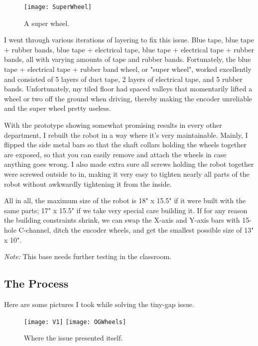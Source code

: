 \begin{figure}[h]
    \centering
    \texttt{[image: SuperWheel]}
    \caption{
        A super wheel.
    }
\end{figure}

I went through various iterations of layering to fix this issue. Blue tape, blue tape + rubber bands, blue tape + electrical tape, blue tape + electrical tape + rubber bands, all with varying amounts of tape and rubber bands. Fortunately, the blue tape + electrical tape + rubber band wheel, or "super wheel", worked excellently and consisted of 5 layers of duct tape, 2 layers of electrical tape, and 5 rubber bands. Unfortunately, my tiled floor had spaced valleys that momentarily lifted a wheel or two off the ground when driving, thereby making the encoder unreliable and the super wheel pretty useless.

With the prototype showing somewhat promising results in every other department, I rebuilt the robot in a way where it's very maintainable. Mainly, I flipped the side metal bars so that the shaft collars holding the wheels together are exposed, so that you can easily remove and attach the wheels in case anything goes wrong. I also made extra sure all screws holding the robot together were screwed outside to in, making it very easy to tighten nearly all parts of the robot without awkwardly tightening it from the inside.

All in all, the maximum size of the robot is 18" x 15.5" if it were built with the same parts; 17" x 15.5" if we take very special care building it. If for any reason the building constraints shrink, we can swap the X-axis and Y-axis bars with 15-hole C-channel, ditch the encoder wheels, and get the smallest possible size of 13" x 10".

\textit{Note:} This base needs further testing in the classroom.

\subsection{The Process}
Here are some pictures I took while solving the tiny-gap issue.

\begin{figure}[h]
    \centering
    \texttt{[image: V1]}
    \texttt{[image: OGWheels]}
    \caption{
        Where the issue presented itself.
    }
\end{figure}

